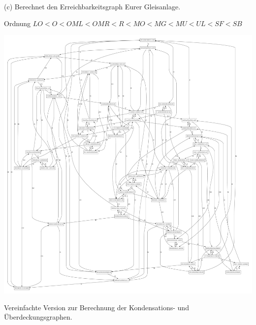 \documentclass{scrreprt}
\begin{document}
\begin{enumerate}
(c) Berechnet den Erreichbarkeitsgraph Eurer Gleisanlage.

Ordnung \(LO < O < OML < OMR < R < MO < MG < MU < UL < SF < SB\)

\includegraphics[width=1\textwidth]{eg.pdf}

Vereinfachte Version zur Berechnung der Kondensations- und Überdeckungsgraphen.


\end{enumerate}
\end{document}
